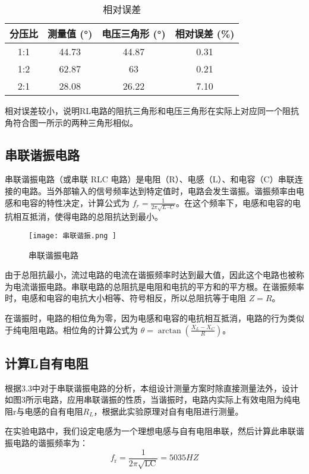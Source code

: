 \documentclass[dvipsnames, svgnames,a4paper,11pt]{article}
\begin{document}
\begin{table}[H]
    \centering
    \begin{tabular}{|c|c|c|c|}
        \hline
        分压比 & 测量值 (°) & 电压三角形 (°) & 相对误差 (\%) \\
        \hline
        1:1   & 44.73      & 44.87             &  0.31 \\
        1:2   & 62.87      & 63                & 0.21 \\
        2:1   & 28.08      & 26.22             &  7.10 \\
        \hline
    \end{tabular}
    \caption{相对误差}
\end{table}

相对误差较小，说明RL电路的阻抗三角形和电压三角形在实际上对应同一个阻抗角符合图一所示的两种三角形相似。
	\subsection{串联谐振电路}
	串联谐振电路（或串联 RLC 电路）是电阻（R）、电感（L）、和电容（C）串联连接的电路。当外部输入的信号频率达到特定值时，电路会发生谐振。谐振频率由电感和电容的特性决定，计算公式为 \( f_r = \frac{1}{2\pi \sqrt{L \cdot C}} \)。在这个频率下，电感和电容的电抗相互抵消，使得电路的总阻抗达到最小。
	\begin{figure}[{H}]
		\centering
		\texttt{[image: 串联谐振.png
		]}
		\caption{串联谐振电路}
		\label{}
	\end{figure}

由于总阻抗最小，流过电路的电流在谐振频率时达到最大值，因此这个电路也被称为电流谐振电路。串联电路的总阻抗是电阻和电抗的平方和的平方根。在谐振频率时，电感和电容的电抗大小相等、符号相反，所以总阻抗等于电阻 \( Z = R \)。

在谐振时，电路的相位角为零，因为电感和电容的电抗相互抵消，电路的行为类似于纯电阻电路。相位角的计算公式为 \( \theta = \arctan\left( \frac{X_L - X_C}{R} \right) \)。

	
	\subsection{计算L自有电阻}
	根据3.3中对于串联谐振电路的分析，本组设计测量方案时除直接测量法外，设计如图3所示电路，应用串联谐振的性质，当谐振时，电路内实际上有效电阻为纯电阻r与电感的自有电阻$R_L$，根据此实验原理对自有电阻进行测量。
	
	在实验电路中，我们设定电感为一个理想电感与自有电阻串联，然后计算此串联谐振电路的谐振频率为：
	$$f_{\mathrm{r}}=\frac1{2\pi\sqrt{\mathrm{LC}}}=5035HZ$$
\end{document}
